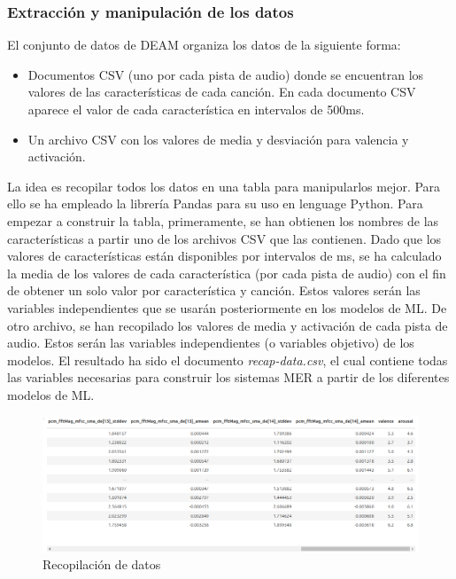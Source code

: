 \documentclass[12pt,a4paper,Spanish]{article}
\begin{document}
\subsubsection{Extracción y manipulación de los datos}
El conjunto de datos de DEAM \cite{AlajankiEmoInMusicAnalysis} organiza los datos de la siguiente forma:
\begin{itemize}
	\item Documentos CSV (uno por cada pista de audio) donde se encuentran los valores de las características de cada canción. En cada documento CSV aparece el valor de cada característica en intervalos de 500ms.
	\item Un archivo CSV con los valores de media y desviación para valencia y activación.
\end{itemize}
La idea es recopilar todos los datos en una tabla para manipularlos mejor. Para ello se ha empleado la librería Pandas \cite{mckinney-proc-scipy-2010} para su uso en lenguage Python.
\newline
Para empezar a construir la tabla, primeramente, se han obtienen los nombres de las características a partir  uno de los archivos CSV que las contienen. Dado que los valores de características están disponibles por intervalos de ms, se ha calculado la media de los valores de cada característica (por cada pista de audio) con el fin de obtener un solo valor por característica y canción. Estos valores serán las variables independientes que se usarán posteriormente en los modelos de ML.
\newline
De otro archivo, se han recopilado los valores de media y activación de cada pista de audio. Estos serán las variables independientes (o variables objetivo) de los modelos.
\newline
El resultado ha sido el documento \textit{recap-data.csv}, el cual contiene todas las variables necesarias para construir los sistemas MER a partir de los diferentes modelos de ML.

\begin{figure}[H]
	\centering
	\includegraphics[width=0.7\linewidth]{figs/data}
	\caption{Recopilación de datos}
	\label{fig:data}
\end{figure}
\end{document}
